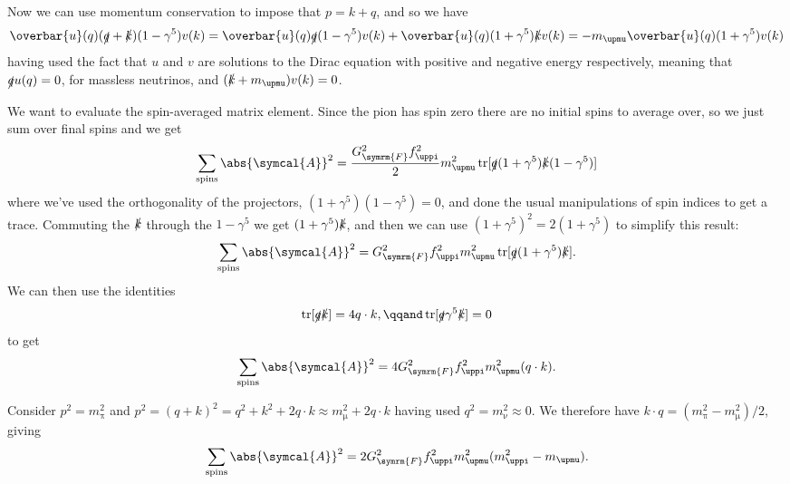 \documentclass[fleqn]{NotesClass}
\newcommand{\Pmux}{\ensuremath{\upmu}}
\newcommand{\Pnu}{\ensuremath{\upnu}}
\newcommand{\Ppi}{\ensuremath{\uppi}}
\newcommand{\diracadjoint}[1]{\overbar{#1}}
\newcommand{\amplitude}{\symcal{A}}
\DeclareMathOperator{\tr}{tr}
\newcommand{\fermiConst}{G_{\symrm{F}}}
\begin{document}
    Now we can use momentum conservation to impose that \(p = k + q\), and so we have
    \begin{equation}
        \diracadjoint{u}(q)(\slashed{q} + \slashed{k})(1 - \gamma^5)v(k) = \diracadjoint{u}(q)\slashed{q}(1 - \gamma^5)v(k) + \diracadjoint{u}(q)(1 + \gamma^5)\slashed{k}v(k) = -m_{\Pmux}\diracadjoint{u}(q)(1 + \gamma^5)v(k)
    \end{equation}
    having used the fact that \(u\) and \(v\) are solutions to the Dirac equation with positive and negative energy respectively, meaning that \(\slashed{q}u(q) = 0\), for massless neutrinos, and \((\slashed{k} + m_{\Pmux})v(k) = 0\).
    
    We want to evaluate the spin-averaged matrix element.
    Since the pion has spin zero there are no initial spins to average over, so we just sum over final spins and we get
    \begin{equation}
        \sum_{\text{spins}} \abs{\amplitude}^2 = \frac{\fermiConst^2f_{\Ppi}^2}{2} m_{\Pmux}^2 \tr[\slashed{q}(1 + \gamma^5)\slashed{k}(1 - \gamma^5)]
    \end{equation}
    where we've used the orthogonality of the projectors, \((1 + \gamma^5)(1 - \gamma^5) = 0\), and done the usual manipulations of spin indices to get a trace.
    Commuting the \(\slashed{k}\) through the \(1 - \gamma^5\) we get \((1 + \gamma^5)\slashed{k}\), and then we can use \((1 + \gamma^5)^2 = 2(1 + \gamma^5)\) to simplify this result:
    \begin{equation}
        \sum_{\text{spins}} \abs{\amplitude}^2 = \fermiConst^2 f_{\Ppi}^2 m_{\Pmux}^2 \tr[\slashed{q}(1 + \gamma^5)\slashed{k}].
    \end{equation}
    We can then use the identities
    \begin{equation}
        \tr[\slashed{q}\slashed{k}] = 4q \cdot k, \qqand \tr[\slashed{q}\gamma^5\slashed{k}] = 0
    \end{equation}
    to get
    \begin{equation}
        \sum_{\text{spins}} \abs{\amplitude}^2 = 4\fermiConst^2 f_{\Ppi}^2 m_{\Pmux}^2 (q \cdot k).
    \end{equation}
    
    Consider \(p^2 = m_{\Ppi}^2\) and \(p^2 = (q + k)^2 = q^2 + k^2 + 2q \cdot k \approx m_{\Pmux}^2 + 2q\cdot k\) having used \(q^2 = m_{\Pnu}^2 \approx 0\).
    We therefore have \(k \cdot q = (m_{\Ppi}^2 - m_{\Pmux}^2)/2\), giving
    \begin{equation}
        \sum_{\text{spins}} \abs{\amplitude}^2 = 2\fermiConst^2 f_{\Ppi}^2 m_{\Pmux}^2(m_{\Ppi}^2 - m_{\Pmux}).
    \end{equation}
    
\end{document}
